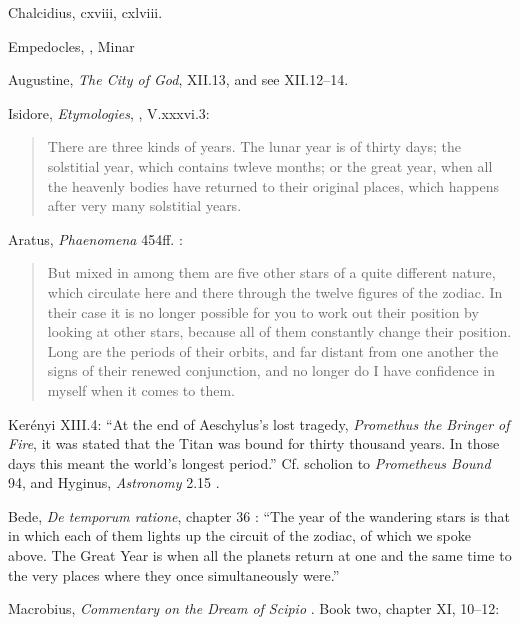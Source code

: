 \documentclass{amsart}
\theoremstyle{definition}
\begin{document}
Chalcidius, cxviii, cxlviii.

Empedocles, \cite{obrien}, Minar \cite{minar}

Augustine, {\em The City of God}, XII.13, and see XII.12--14.

Isidore, {\em Etymologies}, \cite{isidore}, V.xxxvi.3: 

\begin{quote}
There are three kinds of years. The lunar year is of thirty days; the solstitial year, which contains twleve months;
or the great year, when all the heavenly bodies have returned to their original places, which happens after
very many solstitial years.
\end{quote}

Aratus, {\em Phaenomena} 454ff. \cite[pp.~149--150]{constellations}:

\begin{quote}
But mixed in among them are five other stars of a quite different nature, which circulate here and there through the twelve figures of the zodiac. In their case
it is no longer possible for you to work out their position by looking at other stars, because all of them constantly change their position. Long are the periods of their orbits,
and far distant from one another the signs of their renewed conjunction, and no longer do I have confidence in myself when it comes to them.
\end{quote}

Ker\'enyi \cite{kerenyi} XIII.4: ``At the end of Aeschylus's lost tragedy, {\em Promethus the Bringer of Fire}, it was stated that the Titan was bound for thirty thousand years. In those days this meant the world's longest period.'' Cf. scholion to {\em Prometheus Bound} 94, and 
Hyginus, {\em Astronomy} 2.15 \cite[pp.~54--55]{constellations}.

Bede, {\em De temporum ratione}, chapter 36 \cite[p.~104]{bede}: ``The year of the wandering stars is that in which each of them lights up the circuit of the zodiac, of which we spoke above. The Great Year is when all the planets return at one and the same time to the very places where they once simultaneously were.''

Macrobius, {\em Commentary on the Dream of Scipio} \cite[pp.~219--222]{macrobius}. Book two, chapter XI, 10--12:
\end{document}
